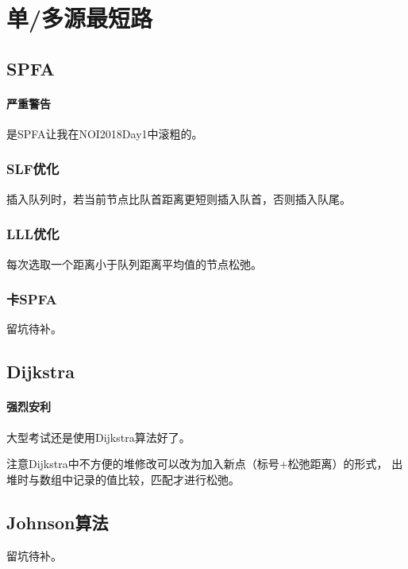 \section{单/多源最短路}
\subsection{SPFA}
\paragraph{严重警告}
是SPFA让我在NOI2018Day1中滚粗的。
\subsubsection{SLF优化}
插入队列时，若当前节点比队首距离更短则插入队首，否则插入队尾。
\subsubsection{LLL优化}
每次选取一个距离小于队列距离平均值的节点松弛。
\subsubsection{卡SPFA}
留坑待补。
\subsection{Dijkstra}
\paragraph{强烈安利}
大型考试还是使用Dijkstra算法好了。

注意Dijkstra中不方便的堆修改可以改为加入新点（标号+松弛距离）的形式，
出堆时与数组中记录的值比较，匹配才进行松弛。
\subsection{Johnson算法}
留坑待补。
